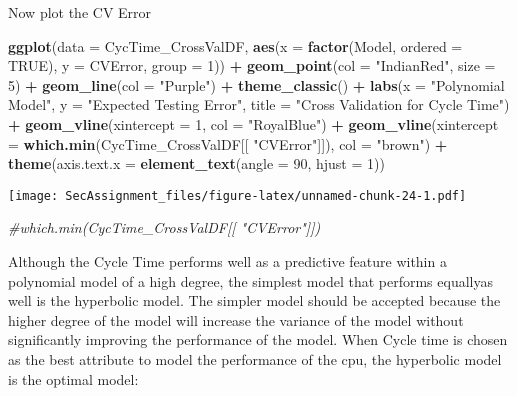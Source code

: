 \documentclass[12pt]{article}
\newenvironment{Shaded}{\begin{snugshade}}{\end{snugshade}}
\newcommand{\CommentTok}[1]{\textcolor[rgb]{0.56,0.35,0.01}{\textit{#1}}}
\newcommand{\DataTypeTok}[1]{\textcolor[rgb]{0.13,0.29,0.53}{#1}}
\newcommand{\DecValTok}[1]{\textcolor[rgb]{0.00,0.00,0.81}{#1}}
\newcommand{\KeywordTok}[1]{\textcolor[rgb]{0.13,0.29,0.53}{\textbf{#1}}}
\newcommand{\NormalTok}[1]{#1}
\newcommand{\OperatorTok}[1]{\textcolor[rgb]{0.81,0.36,0.00}{\textbf{#1}}}
\newcommand{\OtherTok}[1]{\textcolor[rgb]{0.56,0.35,0.01}{#1}}
\newcommand{\StringTok}[1]{\textcolor[rgb]{0.31,0.60,0.02}{#1}}
\begin{document}
Now plot the CV Error

\begin{Shaded}
\begin{Highlighting}[]
\KeywordTok{ggplot}\NormalTok{(}\DataTypeTok{data =}\NormalTok{ CycTime_CrossValDF, }\KeywordTok{aes}\NormalTok{(}\DataTypeTok{x =} \KeywordTok{factor}\NormalTok{(Model, }\DataTypeTok{ordered =} \OtherTok{TRUE}\NormalTok{), }\DataTypeTok{y =}\NormalTok{ CVError, }\DataTypeTok{group =} \DecValTok{1}\NormalTok{)) }\OperatorTok{+}
\StringTok{  }\KeywordTok{geom_point}\NormalTok{(}\DataTypeTok{col =} \StringTok{"IndianRed"}\NormalTok{, }\DataTypeTok{size =} \DecValTok{5}\NormalTok{) }\OperatorTok{+}
\KeywordTok{geom_line}\NormalTok{(}\DataTypeTok{col =} \StringTok{"Purple"}\NormalTok{) }\OperatorTok{+}
\StringTok{  }\KeywordTok{theme_classic}\NormalTok{() }\OperatorTok{+}\StringTok{ }
\StringTok{  }\KeywordTok{labs}\NormalTok{(}\DataTypeTok{x =} \StringTok{"Polynomial Model"}\NormalTok{, }\DataTypeTok{y =} \StringTok{"Expected Testing Error"}\NormalTok{, }\DataTypeTok{title =} \StringTok{"Cross Validation for Cycle Time"}\NormalTok{) }\OperatorTok{+}
\StringTok{  }\KeywordTok{geom_vline}\NormalTok{(}\DataTypeTok{xintercept =}  \DecValTok{1}\NormalTok{, }\DataTypeTok{col =} \StringTok{"RoyalBlue"}\NormalTok{) }\OperatorTok{+}
\StringTok{  }\KeywordTok{geom_vline}\NormalTok{(}\DataTypeTok{xintercept =} \KeywordTok{which.min}\NormalTok{(CycTime_CrossValDF[[ }\StringTok{"CVError"}\NormalTok{]]), }\DataTypeTok{col =} \StringTok{"brown"}\NormalTok{) }\OperatorTok{+}
\StringTok{  }\KeywordTok{theme}\NormalTok{(}\DataTypeTok{axis.text.x =} \KeywordTok{element_text}\NormalTok{(}\DataTypeTok{angle =} \DecValTok{90}\NormalTok{, }\DataTypeTok{hjust =} \DecValTok{1}\NormalTok{))}
\end{Highlighting}
\end{Shaded}

\texttt{[image: SecAssignment\_files/figure-latex/unnamed-chunk-24-1.pdf]}

\begin{Shaded}
\begin{Highlighting}[]
\CommentTok{#which.min(CycTime_CrossValDF[[ "CVError"]])}
\end{Highlighting}
\end{Shaded}

Although the Cycle Time performs well as a predictive feature within a
polynomial model of a high degree, the simplest model that performs
equallyas well is the hyperbolic model. The simpler model should be
accepted because the higher degree of the model will increase the
variance of the model without significantly improving the performance of
the model. When Cycle time is chosen as the best attribute to model the
performance of the cpu, the hyperbolic model is the optimal model:
\end{document}
